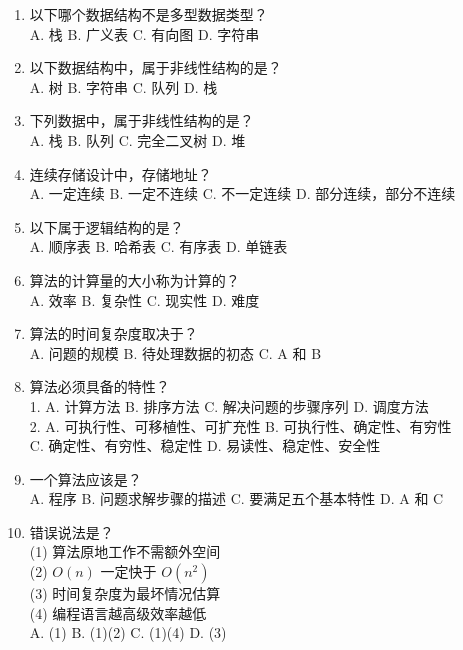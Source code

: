 \documentclass[lang=cn,newtx,10pt,scheme=chinese]{../../elegantbook}
\begin{document}
\begin{enumerate}
    \item 以下哪个数据结构不是多型数据类型？\\
    A. 栈 \quad B. 广义表 \quad C. 有向图 \quad D. 字符串

    \item 以下数据结构中，属于非线性结构的是？\\
    A. 树 \quad B. 字符串 \quad C. 队列 \quad D. 栈

    \item 下列数据中，属于非线性结构的是？\\
    A. 栈 \quad B. 队列 \quad C. 完全二叉树 \quad D. 堆

    \item 连续存储设计中，存储地址？\\
    A. 一定连续 \quad B. 一定不连续 \quad C. 不一定连续 \quad D. 部分连续，部分不连续

    \item 以下属于逻辑结构的是？\\
    A. 顺序表 \quad B. 哈希表 \quad C. 有序表 \quad D. 单链表

    \item 算法的计算量的大小称为计算的？\\
    A. 效率 \quad B. 复杂性 \quad C. 现实性 \quad D. 难度

    \item 算法的时间复杂度取决于？\\
    A. 问题的规模 \quad B. 待处理数据的初态 \quad C. A 和 B

    \item 算法必须具备的特性？\\
    1. A. 计算方法 \quad B. 排序方法 \quad C. 解决问题的步骤序列 \quad D. 调度方法\\
    2. A. 可执行性、可移植性、可扩充性 \quad B. 可执行性、确定性、有穷性 \\
       C. 确定性、有穷性、稳定性 \quad D. 易读性、稳定性、安全性

    \item 一个算法应该是？\\
    A. 程序 \quad B. 问题求解步骤的描述 \quad C. 要满足五个基本特性 \quad D. A 和 C

    \item 错误说法是？\\
    (1) 算法原地工作不需额外空间 \\ (2) $O(n)$ 一定快于 $O(n^2)$ \\ (3) 时间复杂度为最坏情况估算 \\ (4) 编程语言越高级效率越低 \\
    A. (1) \quad B. (1)(2) \quad C. (1)(4) \quad D. (3)


\end{enumerate}
\end{document}
